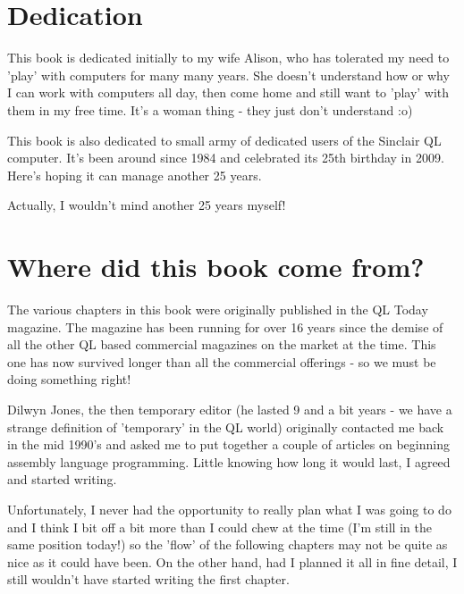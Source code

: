 \chapter{Dedication}

This book is dedicated initially to my wife Alison, who has
    tolerated my need to 'play' with computers for many many years. She
    doesn't understand how or why I can work with computers all day, then come
    home and still want to 'play' with them in my free time. It's a woman
    thing -{} they just don't understand :o)

This book is also dedicated to small army of dedicated users of the
    Sinclair QL computer. It's been around since 1984 and celebrated its 25th
    birthday in 2009. Here's hoping it can manage another 25 years.

Actually, I wouldn't mind another 25 years myself!
\setcounter{secnumdepth}{5}
\setcounter{tocdepth}{5}
\setcounter{secnumdepth}{-1}
\setcounter{tocdepth}{-1}

\chapter{Where did this book come from?}

The various chapters in this book were originally published in the
    QL Today magazine. The magazine has been running for over 16 years since
    the demise of all the other QL based commercial magazines on the market at
    the time. This one has now survived longer than all the commercial
    offerings -{} so we must be doing something right!

Dilwyn Jones, the then temporary editor (he lasted 9 and a bit years
    -{} we have a strange definition of 'temporary' in the QL world) originally
    contacted me back in the mid 1990's and asked me to put together a couple
    of articles on beginning assembly language programming. Little knowing how
    long it would last, I agreed and started writing.

Unfortunately, I never had the opportunity to really plan what I was
    going to do and I think I bit off a bit more than I could chew at the time
    (I'm still in the same position today!) so the 'flow' of the following
    chapters may not be quite as nice as it could have been. On the other
    hand, had I planned it all in fine detail, I still wouldn't have started
    writing the first chapter.

